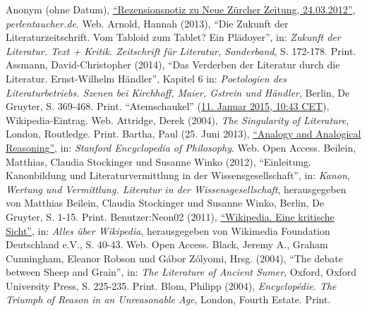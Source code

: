 \documentclass[fontsize=12pt]{scrartcl}
\begin{document}
{{{{\begin{thebibliography}
	Anonym\textsuperscript{\tiny *} (ohne Datum), \href{http://www.perlentaucher.de/buch/patrick-modiano/im-cafe-der-verlorenen-jugend.html}{"`Rezensionsnotiz zu Neue Z\"urcher Zeitung, 24.03.2012"'}, \textit{perlentaucher.de}. Web.
	Arnold, Hannah (2013), "`Die Zukunft der Li\-te\-ra\-tur\-zeitschrift. Vom Tabloid zum Tablet? Ein Pl\"adoyer"', in: \textit{Zukunft der Li\-te\-ra\-tur. Text + Kritik. Zeitschrift f\"ur Li\-te\-ra\-tur, Sonderband}, S. 172-178. Print.
	Assmann, David-Christopher (2014), "`Das Verderben der Li\-te\-ra\-tur durch die Li\-te\-ra\-tur. Ernst-Wilhelm H\"andler"', Kapitel 6 in: \textit{Poetologien des Li\-te\-ra\-tur\-betriebs. Szenen bei Kirchhoff, Maier, Gstrein und H\"andler}, Berlin, De Gruyter, S. 369-468. Print.
	"`Atemschaukel"' (\href{https://de.wikipedia.org/w/index.php?title=Atemschaukel\&oldid=137657441}{11. Januar 2015, 10:43 CET}), Wi\-ki\-pe\-dia-Ein\-trag. Web.
	Attridge, Derek (2004), \textit{The Singularity of Li\-te\-ra\-ture}, London, Routledge. Print.
	Bartha, Paul (25. Juni 2013), \href{http://plato.stanford.edu/entries/reasoning-analogy/}{"`Analogy and Analogical Reasoning"'}, in: \textit{Stanford Encyclopedia of Philosophy}. Web. Open Access.
	Beilein, Matthias, Claudia Stockinger und Susanne Winko (2012), "`Einleitung. Ka\-non\-bil\-dung und Li\-te\-ra\-tur\-ver\-mitt\-lung in der Wissensge\-sell\-schaft"', in: \textit{Kanon, Wertung und Ver\-mitt\-lung. Li\-te\-ra\-tur in der Wissensge\-sell\-schaft}, he\-rausgegeben von Mat\-thias Bei\-lein, Claudia Stockinger und Susanne Winko, Berlin, De Gruyter, S. 1-15. Print.
	Be\-nut\-zer:Neon02 (2011), \href{https://commons.wikimedia.org/w/index.php?title=File:Allesueberwikipedia.pdf\&page=40}{"`Wi\-ki\-pe\-dia. Eine kritische Sicht"'}, in: \textit{Alles \"uber Wi\-ki\-pe\-dia}, herausgegeben von Wikimedia Foundation Deutschland e.V., S. 40-43. Web. Open Access.
	Black, Jeremy A., Graham Cunningham, Eleanor Robson und G\'{a}bor Z\'{o}lyomi, Hrsg. (2004), "`The debate between Sheep and Grain"', in: \textit{The Li\-te\-ra\-ture of Ancient Sumer}, Oxford, Oxford University Press, S. 225-235. Print.
	Blom, Philipp (2004), \textit{Encyclop\'{e}die. The Triumph of Reason in an Unreasonable Age}, London, Fourth Estate. Print.

\end{thebibliography}}}}}
\end{document}
